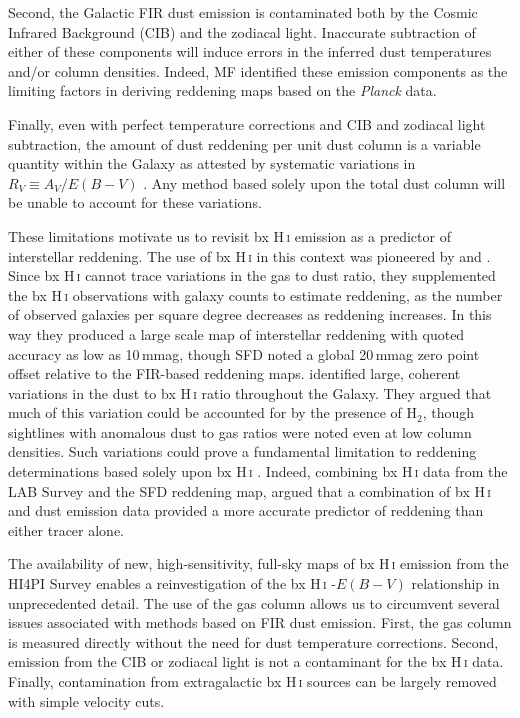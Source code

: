 \documentclass[iop,apj]{emulateapj}
\makeatletter
\def\testbx{bx}%
\DeclareRobustCommand{\ion}[2]{%
\relax\ifmmode
\ifx\testbx\f@series
{\mathbf{#1\,\mathsc{#2}}}\else
{\mathrm{#1\,\mathsc{#2}}}\fi
\else\textup{#1\,{\mdseries\textsc{#2}}}%
\fi}
\makeatother
\begin{document}
Second, the Galactic FIR dust emission is contaminated both by the Cosmic Infrared Background (CIB) and the zodiacal light. Inaccurate subtraction of either of these components will induce errors in the inferred dust temperatures and/or column densities. Indeed, MF identified these emission components as the limiting factors in deriving reddening maps based on the {\it Planck} data.

Finally, even with perfect temperature corrections and CIB and zodiacal light subtraction, the amount of dust reddening per unit dust column is a variable quantity within the Galaxy as attested by systematic variations in $R_V \equiv A_V/E(B-V)$ \citep{Cardelli+Clayton+Mathis_1989, Fitzpatrick+Massa_2007, Schlafly+etal_2016}. Any method based solely upon the total dust column will be unable to account for these variations.

These limitations motivate us to revisit \ion{H}{i} emission as a predictor of interstellar reddening. The use of \ion{H}{i} in this context was pioneered by \citet{Burstein+Heiles_1978} and \citet{Burstein+Heiles_1982}. Since \ion{H}{i} cannot trace variations in the gas to dust ratio, they supplemented the \ion{H}{i} observations with galaxy counts to estimate reddening, as the number of observed galaxies per square degree decreases as reddening increases. In this way they produced a large scale map of interstellar reddening with quoted accuracy as low as 10\,mmag, though SFD noted a global 20\,mmag zero point offset relative to the FIR-based reddening maps. \citet{Burstein+Heiles_1978} identified large, coherent variations in the dust to \ion{H}{i} ratio throughout the Galaxy. They argued that much of this variation could be accounted for by the presence of H$_2$, though sightlines with anomalous dust to gas ratios were noted even at low column densities. Such variations could prove a fundamental limitation to reddening determinations based solely upon \ion{H}{i}. Indeed, combining \ion{H}{i} data from the LAB Survey \citep{Kalberla+etal_2005} and the SFD reddening map, \citet{Peek_2013} argued that a combination of \ion{H}{i} and dust emission data provided a more accurate predictor of reddening than either tracer alone.

The availability of new, high-sensitivity, full-sky maps of \ion{H}{i} emission from the HI4PI Survey \citep{Hi4pi_2016} enables a reinvestigation of the \ion{H}{i}-$E(B-V)$ relationship in unprecedented detail. The use of the gas column allows us to circumvent several issues associated with methods based on FIR dust emission. First, the gas column is measured directly without the need for dust temperature corrections. Second, emission from the CIB or zodiacal light is not a contaminant for the \ion{H}{i} data. Finally, contamination from extragalactic \ion{H}{i} sources can be largely removed with simple velocity cuts. 
\end{document}
